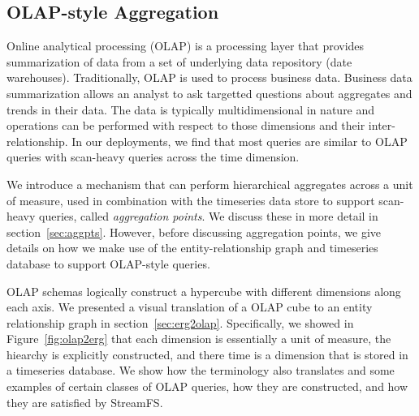

\subsection{OLAP-style Aggregation}

Online analytical processing (OLAP) is a processing layer that provides summarization of data
from a set of underlying data repository (date warehouses).  Traditionally, OLAP is used to process
business data.  Business data summarization allows an analyst to ask targetted questions about aggregates 
and trends in their data.  The data is typically multidimensional in nature and operations can be performed with
respect to those dimensions and their inter-relationship.  In our deployments, we find that most queries are 
similar to OLAP queries with scan-heavy queries across the time dimension.

We introduce a mechanism that can perform hierarchical aggregates across a unit of measure, used in combination
with the timeseries data store to support scan-heavy queries, called \emph{aggregation points}.  We discuss
these in more detail in section~\ref{sec:aggpts}.  However, before discussing aggregation points, we give details
on how we make use of the entity-relationship graph and timeseries database to support OLAP-style queries.

OLAP schemas logically construct a hypercube with different dimensions along each axis.  We presented a visual translation of
a OLAP cube to an entity relationship graph in section~\ref{sec:erg2olap}.  Specifically, we showed in Figure~\ref{fig:olap2erg}
that each dimension is essentially a unit of measure, the hiearchy is explicitly constructed, and there
time is a dimension that is stored in a timeseries database.  We show how the terminology also translates and some
examples of certain classes of OLAP queries, how they are constructed, and how they are satisfied by StreamFS.

